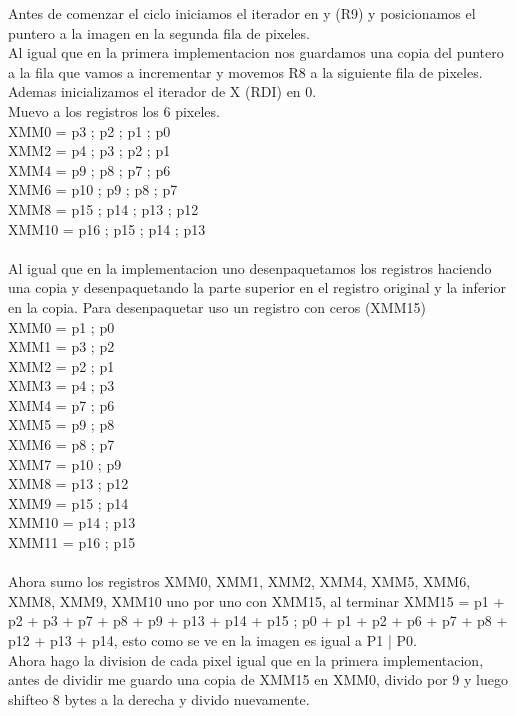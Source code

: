 Antes de comenzar el ciclo iniciamos el iterador en y (R9) y posicionamos el puntero a la imagen en la segunda fila de pixeles. \\

Al igual que en la primera implementacion nos guardamos una copia del puntero a la fila que vamos a incrementar y movemos R8 a la siguiente fila de pixeles. Ademas inicializamos el iterador de X (RDI) en 0. \\

Muevo a los registros los 6 pixeles. \\
	XMM0 = p3 ; p2 ; p1 ; p0 \\
	XMM2 = p4 ; p3 ; p2 ; p1 \\
	XMM4 = p9 ; p8 ; p7 ; p6 \\
	XMM6 = p10 ; p9 ; p8 ; p7 \\
	XMM8 = p15 ; p14 ; p13 ; p12 \\
	XMM10 = p16 ; p15 ; p14 ; p13 \\
\\
Al igual que en la implementacion uno desenpaquetamos los registros haciendo una copia y desenpaquetando la parte superior en el registro original y la inferior en la copia. Para desenpaquetar uso un registro con ceros (XMM15) \\
	XMM0 = p1 ; p0 \\
 	XMM1 = p3 ; p2 \\
 	XMM2 = p2 ; p1 \\
	XMM3 = p4 ; p3 \\ 
	XMM4 = p7 ; p6 \\
	XMM5 = p9 ; p8 \\
	XMM6 = p8 ; p7 \\
 	XMM7 = p10 ; p9 \\
 	XMM8 = p13 ; p12 \\
	XMM9 = p15 ; p14 \\ 
	XMM10 = p14 ; p13 \\
	XMM11 = p16 ; p15 \\
\\
Ahora sumo los registros XMM0, XMM1, XMM2, XMM4, XMM5, XMM6, XMM8, XMM9, XMM10 uno por uno con XMM15, al terminar XMM15 = p1 + p2 + p3 + p7 + p8 + p9 + p13 + p14 + p15 ; p0 + p1 + p2 + p6 + p7 + p8 + p12 + p13 + p14, esto como se ve en la imagen es igual a P1 | P0. \\

Ahora hago la division de cada pixel igual que en la primera implementacion, antes de dividir me guardo una copia de XMM15 en XMM0, divido por 9 y luego shifteo 8 bytes a la derecha y divido nuevamente. \\

